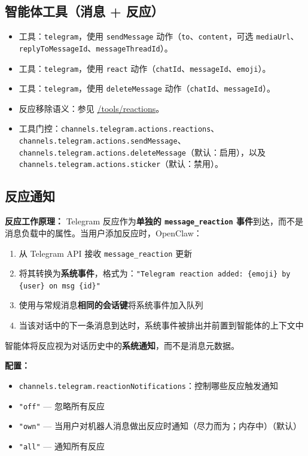 \subsection{智能体工具（消息 + 反应）}


\begin{itemize}
  \item 工具：\texttt{telegram}，使用 \texttt{sendMessage} 动作（\texttt{to}、\texttt{content}，可选 \texttt{mediaUrl}、\texttt{replyToMessageId}、\texttt{messageThreadId}）。
  \item 工具：\texttt{telegram}，使用 \texttt{react} 动作（\texttt{chatId}、\texttt{messageId}、\texttt{emoji}）。
  \item 工具：\texttt{telegram}，使用 \texttt{deleteMessage} 动作（\texttt{chatId}、\texttt{messageId}）。
  \item 反应移除语义：参见 \href{/tools/reactions}{/tools/reactions}。
  \item 工具门控：\texttt{channels.telegram.actions.reactions}、\texttt{channels.telegram.actions.sendMessage}、\texttt{channels.telegram.actions.deleteMessage}（默认：启用），以及 \texttt{channels.telegram.actions.sticker}（默认：禁用）。
\end{itemize}


\subsection{反应通知}


\textbf{反应工作原理：}
Telegram 反应作为\textbf{单独的 \texttt{message\_reaction} 事件}到达，而不是消息负载中的属性。当用户添加反应时，OpenClaw：

\begin{enumerate}
  \item 从 Telegram API 接收 \texttt{message\_reaction} 更新
  \item 将其转换为\textbf{系统事件}，格式为：\texttt{"Telegram reaction added: \{emoji\} by \{user\} on msg \{id\}"}
  \item 使用与常规消息\textbf{相同的会话键}将系统事件加入队列
  \item 当该对话中的下一条消息到达时，系统事件被排出并前置到智能体的上下文中
\end{enumerate}


智能体将反应视为对话历史中的\textbf{系统通知}，而不是消息元数据。

\textbf{配置：}

\begin{itemize}
  \item \texttt{channels.telegram.reactionNotifications}：控制哪些反应触发通知
  \item \texttt{"off"} — 忽略所有反应
  \item \texttt{"own"} — 当用户对机器人消息做出反应时通知（尽力而为；内存中）（默认）
  \item \texttt{"all"} — 通知所有反应
\end{itemize}


